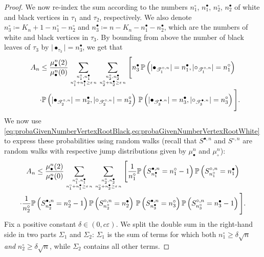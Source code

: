 \documentclass[10pt]{amsart}
\theoremstyle{definition}\newtheorem{defi}[theo]{Definition}\newtheorem{rema}[theo]{Remark}\newtheorem{exam}[theo]{Example}\newtheorem{exem}[theo]{Example}\newtheorem{nota}[theo]{Notation}
\providecommand{\abs}[1]{\lvert#1\rvert}
\def\eps{\varepsilon}
\def\mubn{\mu_{\bullet}^{n}}
\def\mucn{\mu_{\circ}^{n}}
\def\Sbn{S^{\bullet,n}}
\def\Scn{S^{\circ,n}}
\def\Ts{\mathscr{T}}
\renewcommand\Pr[1]{\mathbb{P}\left(#1\right)}
\begin{document}
\begin{proof}
  We now re-index  the sum according to the numbers $n^\circ_1$, $n^\bullet_1$, $n^\circ_2$, $n^\bullet_2$
  of white and black vertices in $\tau_{1}$ and $\tau_{2}$, respectively.
  We also denote $n^\circ_3\coloneqq K_n+1-n^\circ_1-n^\circ_2$
  and $n^\bullet_3\coloneqq n-K_n-n^\bullet_1-n^\bullet_2$, which are the numbers of
  white and black vertices in $\tau_{3}$. By bounding from above the number of black leaves of $\tau_{3}$ by $\abs{\bullet_{\tau_{3}}}=n^\bullet_3$, we get that
  \begin{multline*}
A_{n} \le \frac{\mubn(2)}{\mubn(0)}
   \sum_{n^\circ_1, n^\bullet_1 \atop n^\circ_1 + n^\bullet_1 \geq \eps\, n}
   \sum_{n^\circ_2, n^\bullet_2 \atop n^\circ_2 + n^\bullet_2 \geq \eps\, n}
 \Bigg[ n^\bullet_3 \, \Pr{\abs{\bullet_{\Ts^{\circ,n}_{1}}}= n^\bullet_1, \abs{\circ_{\Ts^{\circ,n}_{1}}}= n^\circ_1} \\
  \qquad \cdot \Pr{\abs{\bullet_{\Ts^{\circ,n}_{2}}}= n^\bullet_2, \abs{\circ_{\Ts^{\circ,n}_{2}}}= n^\circ_2} \,
  \Pr{\abs{\bullet_{\Ts^{\bullet,n}_{3}}}= n^\bullet_3, \abs{\circ_{\Ts^{\bullet,n}_{3}}}= n^\circ_3} \Bigg].
  \end{multline*}
  We now use \cref{eq:probaGivenNumberVertexRootBlack,eq:probaGivenNumberVertexRootWhite}
to express these probabilities using random walks
(recall that $\Sbn$ and $\Scn$ are random walks with respective jump distributions given by $\mubn$ and $\mucn$):
  \begin{multline*}
   A_{n} \le \frac{\mubn(2)}{\mubn(0)}
   \sum_{n^\circ_1, n^\bullet_1 \atop n^\circ_1 + n^\bullet_1 \geq \eps\, n}
   \sum_{n^\circ_2, n^\bullet_2 \atop n^\circ_2 + n^\bullet_2 \geq \eps\, n}
   \Bigg[ \frac{1}{n^\circ_1} \Pr{\Sbn_{n^\bullet_1}=n^\circ_1-1} \Pr{\Scn_{n^\circ_1}=n^\bullet_1}  \\
   \cdot \frac{1}{n^\circ_2} \Pr{\Sbn_{n^\bullet_2}=n^\circ_2-1} \Pr{\Scn_{n^\circ_2}=n^\bullet_2}  \,
   \Pr{\Sbn_{n^\bullet_3}=n^\circ_3} \Pr{\Scn_{n^\circ_3}=n^\bullet_3-1} \Bigg].
  \end{multline*}
  Fix a positive constant $\delta \in (0,c \eps)$.
  We split the double sum in the right-hand side in two parts $\varSigma_1$ and $\varSigma_2$:
  $\varSigma_1$ is the sum of terms for which both $n^\circ_1 \ge \delta \sqrt{n}$ {\em and}
  $n^\circ_2 \ge \delta \sqrt{n}$,
  while $\varSigma_2$ contains all other terms.


\end{proof}
\end{document}
